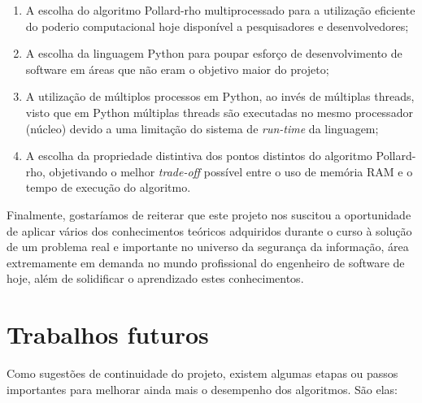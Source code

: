 \begin{enumerate}
\item A escolha do algoritmo Pollard-rho multiprocessado para a utilização eficiente do poderio computacional hoje disponível a pesquisadores e desenvolvedores;

\item A escolha da linguagem Python para poupar esforço de desenvolvimento de
software em áreas que não eram o objetivo maior do projeto;

\item A utilização de múltiplos processos em Python, ao invés de múltiplas threads, visto que em Python múltiplas threads são executadas no mesmo processador (núcleo) devido a uma limitação do sistema de \textit{run-time} da linguagem;

\item A escolha da propriedade distintiva dos pontos distintos do algoritmo Pollard-rho, objetivando o melhor \textit{trade-off} possível entre o uso de memória RAM e o tempo de execução do algoritmo.
\end{enumerate}

Finalmente, gostaríamos de reiterar que este projeto nos suscitou a oportunidade de aplicar vários dos conhecimentos teóricos adquiridos durante o curso à solução de um problema real e importante no universo da segurança da informação, área extremamente em demanda no mundo profissional do engenheiro de software de hoje, além de solidificar o aprendizado estes conhecimentos.

\section{Trabalhos futuros}
Como sugestões de continuidade do projeto, existem algumas etapas ou passos importantes para melhorar ainda mais o desempenho dos algoritmos. São elas:

